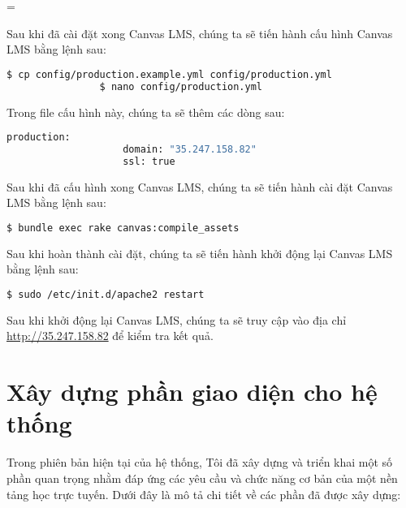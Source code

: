 =\documentclass[../Thesis.tex]{subfiles}
\begin{document}
\begin{enumerate}
            Sau khi đã cài đặt xong Canvas LMS, chúng ta sẽ tiến hành cấu hình Canvas LMS bằng lệnh sau:
            \begin{lstlisting}[language=bash]
                $ cp config/production.example.yml config/production.yml
                $ nano config/production.yml
            \end{lstlisting}

            Trong file cấu hình này, chúng ta sẽ thêm các dòng sau:
            \begin{lstlisting}[language=bash]
                production:
                    domain: "35.247.158.82"
                    ssl: true
            \end{lstlisting}

            Sau khi đã cấu hình xong Canvas LMS, chúng ta sẽ tiến hành cài đặt Canvas LMS bằng lệnh sau:
            \begin{lstlisting}[language=bash]
                $ bundle exec rake canvas:compile_assets
            \end{lstlisting}

        Sau khi hoàn thành cài đặt, chúng ta sẽ tiến hành khởi động lại Canvas LMS bằng lệnh sau:
            \begin{lstlisting}[language=bash]
                $ sudo /etc/init.d/apache2 restart
            \end{lstlisting}

            Sau khi khởi động lại Canvas LMS, chúng ta sẽ truy cập vào địa chỉ \url{http://35.247.158.82} để kiểm tra kết quả.
        \end{enumerate}

\section{Xây dựng phần giao diện cho hệ thống}
\label{subsec:xay-dung-giao-dien}

    Trong phiên bản hiện tại của hệ thống, Tôi đã xây dựng và triển khai một số phần quan trọng nhằm đáp ứng các yêu cầu và chức năng cơ bản của một nền tảng học trực tuyến. Dưới đây là mô tả chi tiết về các phần đã được xây dựng:
\end{document}
